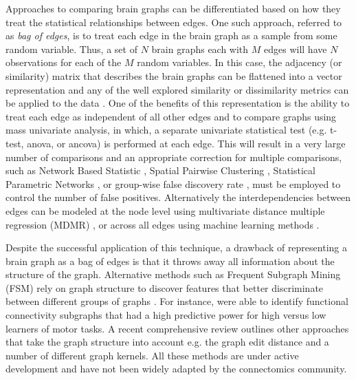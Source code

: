 Approaches to comparing brain graphs can be differentiated based on how they treat the statistical relationships between edges. One such approach, referred to as \emph{bag of edges}, is to treat each edge in the brain graph as a sample from some random variable. Thus, a set of $N$ brain graphs each with $M$ edges will have $N$ observations for each of the $M$ random variables. In this case, the adjacency (or similarity) matrix that describes the brain graphs can be flattened into a vector representation and any of the well explored similarity or dissimilarity metrics can be applied to the data \cite{Craddock2013}. One of the benefits of this representation is the ability to treat each edge as independent of all other edges and to compare graphs using mass univariate analysis, in which, a separate univariate statistical test (e.g. t-test, anova, or ancova) is performed at each edge. This will result in a very large number of comparisons and an appropriate correction for multiple comparisons, such as Network Based Statistic \cite{Zalesky2012}, Spatial Pairwise Clustering \cite{Zalesky2012}, Statistical Parametric Networks \cite{Ginestat2011}, or group-wise false discovery rate  \cite{Benjamini2001}, must be employed to control the number of false positives. Alternatively the interdependencies between edges can be modeled at the node level using multivariate distance multiple regression (MDMR) \cite{Shehzad2014}, or across all edges using machine learning methods \cite{Craddock2009, Dosenbach2010, Richiardi2011}.

Despite the successful application of this technique, a drawback of representing a brain graph as a bag of edges is that it throws away all information about the structure of the graph. Alternative methods such as Frequent Subgraph Mining (FSM) rely on graph structure to discover features that better discriminate between different groups of graphs \cite{Thoma2010}. For instance, \cite{Bogdanov2014} were able to identify functional connectivity subgraphs that had a high predictive power for high versus low learners of motor tasks. A recent comprehensive review \cite{Richiardi2013} outlines other approaches that take the graph structure into account e.g. the graph edit distance and a number of different graph kernels. All these methods are under active development and have not been widely adapted by the connectomics community.


